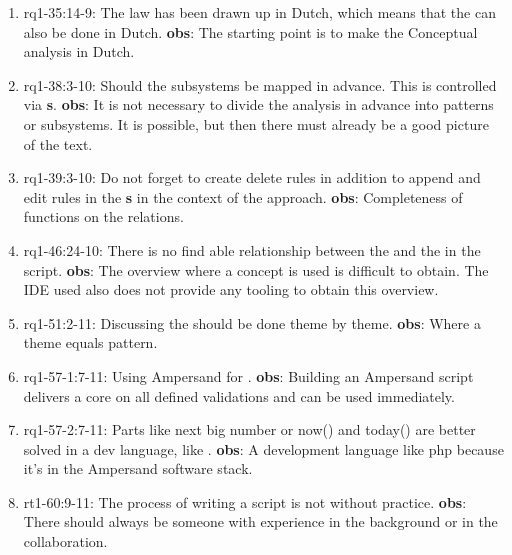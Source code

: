 \begin{enumerate}
    \item rq1-35:14-9: The law has been drawn up in Dutch, which means that the  can also be done in Dutch.
    \newline\textbf{obs}: The starting point is to make the Conceptual analysis in Dutch.
    
    \item rq1-38:3-10: Should the subsystems be mapped in advance.
    This is controlled via \textbf{s}.
    \newline\textbf{obs}: It is not necessary to divide the analysis in advance into patterns or subsystems.
    It is possible, but then there must already be a good picture of the text.
    
    \item rq1-39:3-10: Do not forget to create delete rules in addition to append and edit rules in the \textbf{s} in the context of the  approach.
    \newline\textbf{obs}: Completeness of functions on the relations.
    
    \item rq1-46:24-10: There is no find able relationship between the  and the  in the script.
    \newline\textbf{obs}: The {overview} where a concept is used is difficult to obtain.
    The IDE used also does not provide any tooling to obtain this overview.

    \item rq1-51:2-11: Discussing the  should be done theme by theme.
    \newline\textbf{obs}: Where a theme equals pattern.
    
    \item rq1-57-1:7-11: Using Ampersand for .
    \newline\textbf{obs}: Building an Ampersand script delivers a core on all defined validations and can be used immediately.
    
    \item rq1-57-2:7-11: Parts like next big number or now() and today() are better solved in a dev language, like .
    \newline\textbf{obs}: A development language like php because it's in the Ampersand software stack.

    \item rt1-60:9-11: The process of writing a  script is not without practice.
    \newline\textbf{obs}: There should always be someone with experience in the background or in the collaboration.
    

\end{enumerate}

